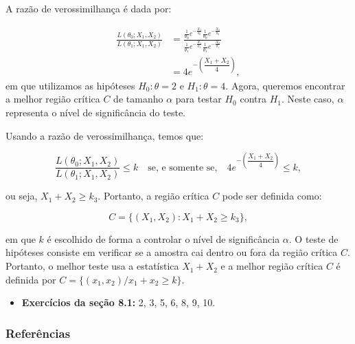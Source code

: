 \documentclass[12pt]{beamer}
\begin{document}
\begin{frame}{}
\begin{block}{}
\justifying
A razão de verossimilhança é dada por:

\begin{align*}
    \frac{L(\theta_0; X_1, X_2)}{L(\theta_1; X_1, X_2)} &= \frac{\frac{1}{\theta_0} e^{-\frac{X_1}{\theta_0}} \frac{1}{\theta_0} e^{-\frac{X_2}{\theta_0}}}{\frac{1}{\theta_1} e^{-\frac{X_1}{\theta_1}} \frac{1}{\theta_1} e^{-\frac{X_2}{\theta_1}}}\\ 
&= 4e^{-\left(\dfrac{X_1+X_2}{4}\right)},
\end{align*}
em que utilizamos as hipóteses $H_0: \theta = 2$ e $H_1: \theta = 4.$ Agora, queremos encontrar a melhor região crítica $C$ de tamanho $\alpha$ para testar $H_0$ contra $H_1$. Neste caso, $\alpha$ representa o nível de significância do teste.
\end{block}
\end{frame}


\begin{frame}{}
\begin{block}{}
\justifying
Usando a razão de verossimilhança, temos que:

\[
\frac{L(\theta_0; X_1, X_2)}{L(\theta_1; X_1, X_2)} \leq k \quad \text{se, e somente se,} \quad 4e^{-\left(\dfrac{X_1+X_2}{4}\right)} \leq k,
\]

ou seja, $X_1 + X_2 \geq k_{3}$. Portanto, a região crítica $C$ pode ser definida como:

\[
C = \{(X_1, X_2) : X_1 + X_2 \geq k_{3}\},
\]

em que $k$ é escolhido de forma a controlar o nível de significância $\alpha$. O teste de hipóteses consiste em verificar se a amostra cai dentro ou fora da região crítica $C$. Portanto, o melhor teste usa a estatística $X_1 + X_2$ e a melhor região crítica $C$ é definida por $C=\{(x_{1},x_{2})/x_{1}+x_{2}\geq k\}$.
\end{block}
\end{frame}

\begin{frame}{\Home}
\begin{block}{}
\justifying

\begin{itemize}
    \item \textbf{Exercícios da seção 8.1:} 2, 3, 5, 6, 8, 9, 10.
\end{itemize}
\end{block}
\nocite{hogg}
\end{frame}

\begin{frame}[allowframebreaks]
\frametitle{\bf Referências}
\printbibliography
\end{frame}
\end{document}
